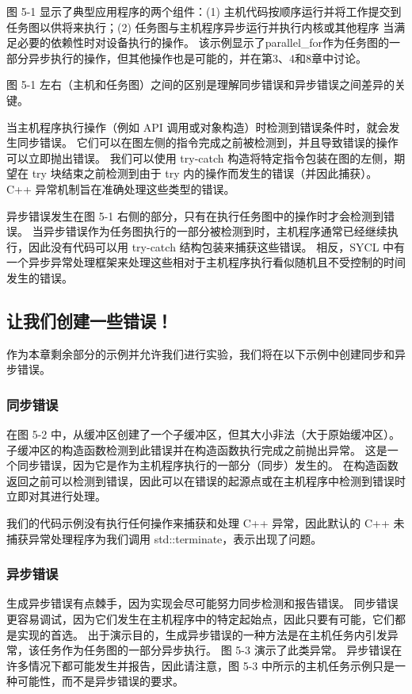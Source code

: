 图 5-1 显示了典型应用程序的两个组件：(1) 主机代码按顺序运行并将工作提交到任务图以供将来执行；(2) 任务图与主机程序异步运行并执行内核或其他程序 当满足必要的依赖性时对设备执行的操作。 该示例显示了parallel\_for作为任务图的一部分异步执行的操作，但其他操作也是可能的，并在第3、4和8章中讨论。

图 5-1 左右（主机和任务图）之间的区别是理解同步错误和异步错误之间差异的关键。

当主机程序执行操作（例如 API 调用或对象构造）时检测到错误条件时，就会发生同步错误。 它们可以在图左侧的指令完成之前被检测到，并且导致错误的操作可以立即抛出错误。 我们可以使用 try-catch 构造将特定指令包装在图的左侧，期望在 try 块结束之前检测到由于 try 内的操作而发生的错误（并因此捕获）。 C++ 异常机制旨在准确处理这些类型的错误。

异步错误发生在图 5-1 右侧的部分，只有在执行任务图中的操作时才会检测到错误。 当异步错误作为任务图执行的一部分被检测到时，主机程序通常已经继续执行，因此没有代码可以用 try-catch 结构包装来捕获这些错误。 相反，SYCL 中有一个异步异常处理框架来处理这些相对于主机程序执行看似随机且不受控制的时间发生的错误。

\subsection{让我们创建一些错误！}
作为本章剩余部分的示例并允许我们进行实验，我们将在以下示例中创建同步和异步错误。

\subsubsection{同步错误}
在图 5-2 中，从缓冲区创建了一个子缓冲区，但其大小非法（大于原始缓冲区）。 子缓冲区的构造函数检测到此错误并在构造函数执行完成之前抛出异常。 这是一个同步错误，因为它是作为主机程序执行的一部分（同步）发生的。 在构造函数返回之前可以检测到错误，因此可以在错误的起源点或在主机程序中检测到错误时立即对其进行处理。

我们的代码示例没有执行任何操作来捕获和处理 C++ 异常，因此默认的 C++ 未捕获异常处理程序为我们调用 std::terminate，表示出现了问题。

\subsubsection{异步错误}
生成异步错误有点棘手，因为实现会尽可能努力同步检测和报告错误。 同步错误更容易调试，因为它们发生在主机程序中的特定起始点，因此只要有可能，它们都是实现的首选。 出于演示目的，生成异步错误的一种方法是在主机任务内引发异常，该任务作为任务图的一部分异步执行。 图 5-3 演示了此类异常。 异步错误在许多情况下都可能发生并报告，因此请注意，图 5-3 中所示的主机任务示例只是一种可能性，而不是异步错误的要求。

